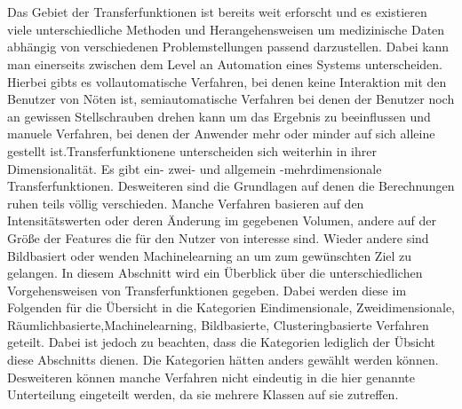 \chapter{}
\label{sec:state_of_the_art}






Das Gebiet der Transferfunktionen ist bereits weit erforscht und es existieren viele unterschiedliche Methoden und Herangehensweisen um medizinische Daten abhängig von verschiedenen Problemstellungen passend darzustellen.
\newline
{}
Dabei kann man einerseits zwischen dem Level an Automation eines Systems unterscheiden. Hierbei gibts es vollautomatische Verfahren, bei denen keine Interaktion mit den Benutzer von Nöten ist, semiautomatische Verfahren bei denen der Benutzer noch an gewissen Stellschrauben drehen kann um das Ergebnis zu beeinflussen und manuele Verfahren, bei denen der Anwender mehr oder minder auf sich alleine gestellt ist.Transferfunktionene unterscheiden sich weiterhin in ihrer Dimensionalität. Es gibt ein- zwei- und allgemein -mehrdimensionale Transferfunktionen. Desweiteren sind die Grundlagen auf denen die Berechnungen ruhen teils völlig verschieden. Manche Verfahren basieren auf den Intensitätswerten oder deren Änderung im gegebenen Volumen, andere auf der Größe der Features die für den Nutzer von interesse sind. Wieder andere sind Bildbasiert oder wenden Machinelearning an um zum gewünschten Ziel zu gelangen.
\newline
In diesem Abschnitt wird ein Überblick über die unterschiedlichen Vorgehensweisen von Transferfunktionen gegeben. Dabei werden diese im Folgenden für die Übersicht in die Kategorien Eindimensionale, Zweidimensionale, Räumlichbasierte,Machinelearning, Bildbasierte, Clusteringbasierte Verfahren geteilt.
\newline
{}
Dabei ist jedoch zu beachten, dass die Kategorien lediglich der Übsicht diese Abschnitts dienen. Die Kategorien hätten anders gewählt werden können. Desweiteren können manche Verfahren nicht eindeutig in die hier genannte Unterteilung eingeteilt werden, da sie mehrere Klassen auf sie zutreffen. 







